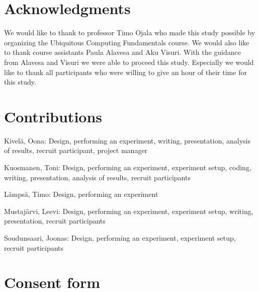 \documentclass{sig-alternate-05-2015}
\begin{document}

\section{Acknowledgments}
We would like to thank to professor Timo Ojala who made this study 
possible by organizing the Ubiquitous Computing Fundamentals course. 
We would also like to thank course assistants Paula Alavesa and Aku Visuri. 
With the guidance from Alavesa and Visuri we were able to proceed this 
study. Especially we would like to thank all participants who were willing 
to give an hour of their time for this study.

\section{Contributions}
Kivelä, Oona: Design, performing an experiment, writing, presentation, analysis of results, recruit participant, project manager

Kuosmanen, Toni: Design, performing an experiment, experiment setup, coding, writing, presentation, analysis of results, recruit participants

Lämpsä, Timo: Design, performing an experiment

Mustajärvi, Leevi: Design, performing an experiment, experiment setup, writing, presentation, recruit participants

Soudunsaari, Joonas: Design, performing an experiment, experiment setup, recruit participants

%

  
%
%
\pagebreak
\appendix
\section{Consent form}

\end{document}
